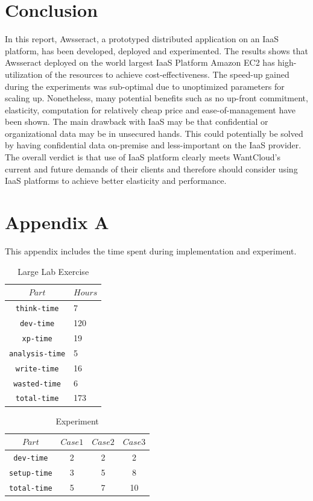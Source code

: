 \documentclass[conference]{IEEEtran}
\begin{document}
\section{Conclusion}
In this report, Awsseract, a prototyped distributed application on an IaaS platform, has been developed, deployed and experimented. The results shows that Awsseract deployed on the world largest IaaS Platform Amazon EC2 has high-utilization of the resources to achieve cost-effectiveness. The speed-up gained during the experiments was sub-optimal due to unoptimized parameters for scaling up. Nonetheless, many potential benefits such as no up-front commitment, elasticity, computation for relatively cheap price and ease-of-management have been shown. The main drawback with IaaS may be that confidential or organizational data may be in unsecured hands. This could potentially be solved by having confidential data on-premise and less-important on the IaaS provider. The overall verdict is that use of IaaS platform clearly meets WantCloud's current and future demands of their clients and therefore should consider using IaaS platforms to achieve better elasticity and performance. 




\section{Appendix A}
This appendix includes the time spent during implementation and experiment. 

\begin{table}[h]
\renewcommand{\arraystretch}{1.3}
\caption{Large Lab Exercise}\label{tab:exe}
\centering
\begin{tabular*}{4cm}{c|p{5cm}}
    \hline
    $Part$&$Hours$\\
    \hline
    \texttt{think-time} & 7 \\
    \texttt{dev-time} & 120 \\
    \texttt{xp-time} & 19 \\
    \texttt{analysis-time} & 5 \\
    \texttt{write-time} & 16 \\
    \texttt{wasted-time} & 6 \\
    \hline \hline
    \texttt{total-time} & 173 \\
    \hline
\end{tabular*}
\end{table}

\begin{table}[h]
\renewcommand{\arraystretch}{1.3}
\caption{Experiment }\label{tab:xp}
\centering
\begin{tabular*}{5.5cm}{c|c|c|c}
    \hline
    $Part$&$Case1$&$Case2$&$Case3$\\
    \hline
    \texttt{dev-time} &2 &2 &2  \\
    \texttt{setup-time} &3 &5 &8 \\
    \hline \hline
    \texttt{total-time} &5 &7 &10 \\
    \hline
\end{tabular*}
\end{table}
\end{document}
